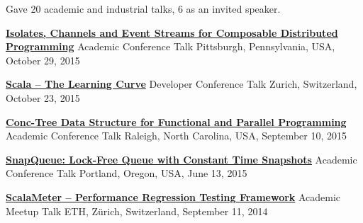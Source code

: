 \documentclass[9pt]{article}
\begin{document}
\begin{easylist}[itemize]
\bigskip




\medskip
{}

\vspace{-0.02in}

\noindent
Gave 20 academic and industrial talks, 6 as an invited speaker.
\newline

\noindent\href{http://axel22.github.io/resources/docs/onward15.pdf}
{\bf Isolates, Channels and Event Streams for Composable Distributed Programming}
\vspace{-0.03in}
\newline\noindent Academic Conference Talk
\dates{}
\linebreak\noindent Pittsburgh, Pennsylvania, USA, October 29, 2015
\bigskip

\noindent\href{http://axel22.github.io/resources/docs/jazoon15.pdf}
{\bf Scala -- The Learning Curve}
\vspace{-0.03in}
\newline\noindent Developer Conference Talk
\dates{}
\linebreak\noindent Zurich, Switzerland, October 23, 2015
\bigskip

\noindent\href{http://axel22.github.io/slides/conc.html#/}
{\bf Conc-Tree Data Structure for Functional and Parallel Programming}
\vspace{-0.03in}
\newline\noindent Academic Conference Talk
\dates{}
\linebreak\noindent Raleigh, North Carolina, USA, September 10, 2015
\bigskip

\noindent\href{http://axel22.github.io/slides/snapq.html#/}
{\bf SnapQueue: Lock-Free Queue with Constant Time Snapshots}
\vspace{-0.03in}
\newline\noindent Academic Conference Talk
\dates{}
\linebreak\noindent Portland, Oregon, USA, June 13, 2015
\bigskip

\noindent\href{https://speakerdeck.com/axel22/scalameter-in-2014}
{\bf ScalaMeter -- Performance Regression Testing Framework}
\vspace{-0.03in}
\newline\noindent Academic Meetup Talk
\dates{}
\linebreak\noindent ETH, Zürich, Switzerland, September 11, 2014
\bigskip


\end{easylist}
\end{document}
